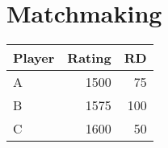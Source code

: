 \section{Matchmaking}

\begin{tabular}{l r r}
	Player		& Rating & RD \\
	\hline
	A			& 1500 & 75 \\
	B			& 1575 & 100 \\
	C			& 1600 & 50 \\
\end{tabular}
